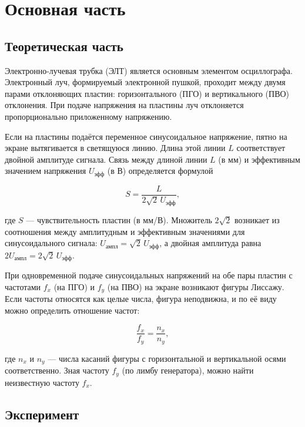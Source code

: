 \section{Основная часть}

\subsection{Теоретическая часть}

Электронно-лучевая трубка (ЭЛТ) является основным элементом осциллографа. Электронный луч, формируемый электронной пушкой, проходит между двумя парами отклоняющих пластин: горизонтального (ПГО) и вертикального (ПВО) отклонения. При подаче напряжения на пластины луч отклоняется пропорционально приложенному напряжению.

Если на пластины подаётся переменное синусоидальное напряжение, пятно на экране вытягивается в светящуюся линию. Длина этой линии \(L\) соответствует двойной амплитуде сигнала. Связь между длиной линии \(L\) (в мм) и эффективным значением напряжения \(U_{\text{эфф}}\) (в В) определяется формулой

\begin{equation}
S = \frac{L}{2\sqrt{2}\,U_{\text{эфф}}},
\label{eq:sensitivity}
\end{equation}

где \(S\) — чувствительность пластин (в мм/В). Множитель \(2\sqrt{2}\) возникает из соотношения между амплитудным и эффективным значениями для синусоидального сигнала: \(U_{\text{ампл}} = \sqrt{2}\,U_{\text{эфф}}\), а двойная амплитуда равна \(2U_{\text{ампл}} = 2\sqrt{2}\,U_{\text{эфф}}\).

При одновременной подаче синусоидальных напряжений на обе пары пластин с частотами \(f_x\) (на ПГО) и \(f_y\) (на ПВО) на экране возникают фигуры Лиссажу. Если частоты относятся как целые числа, фигура неподвижна, и по её виду можно определить отношение частот:

\begin{equation}
\frac{f_x}{f_y} = \frac{n_x}{n_y},
\label{eq:lissajous}
\end{equation}

где \(n_x\) и \(n_y\) — числа касаний фигуры с горизонтальной и вертикальной осями соответственно. Зная частоту \(f_y\) (по лимбу генератора), можно найти неизвестную частоту \(f_x\). 


\subsection{Эксперимент}

